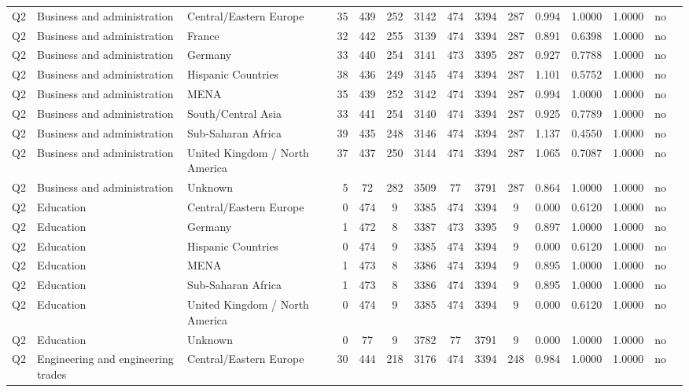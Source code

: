 \begin{longtable}{lllrcccccccccll}
Q2 & Business and administration & Central/Eastern Europe & 35 & 439 & 252 & 3142 & 474 & 3394 & 287 & 0.994 & 1.0000 & 1.0000 & no \\
Q2 & Business and administration & France & 32 & 442 & 255 & 3139 & 474 & 3394 & 287 & 0.891 & 0.6398 & 1.0000 & no \\
Q2 & Business and administration & Germany & 33 & 440 & 254 & 3141 & 473 & 3395 & 287 & 0.927 & 0.7788 & 1.0000 & no \\
Q2 & Business and administration & Hispanic Countries & 38 & 436 & 249 & 3145 & 474 & 3394 & 287 & 1.101 & 0.5752 & 1.0000 & no \\
Q2 & Business and administration & MENA & 35 & 439 & 252 & 3142 & 474 & 3394 & 287 & 0.994 & 1.0000 & 1.0000 & no \\
Q2 & Business and administration & South/Central Asia & 33 & 441 & 254 & 3140 & 474 & 3394 & 287 & 0.925 & 0.7789 & 1.0000 & no \\
Q2 & Business and administration & Sub-Saharan Africa & 39 & 435 & 248 & 3146 & 474 & 3394 & 287 & 1.137 & 0.4550 & 1.0000 & no \\
Q2 & Business and administration & United Kingdom / North America & 37 & 437 & 250 & 3144 & 474 & 3394 & 287 & 1.065 & 0.7087 & 1.0000 & no \\
Q2 & Business and administration & Unknown & 5 & 72 & 282 & 3509 & 77 & 3791 & 287 & 0.864 & 1.0000 & 1.0000 & no \\
Q2 & Education & Central/Eastern Europe & 0 & 474 & 9 & 3385 & 474 & 3394 & 9 & 0.000 & 0.6120 & 1.0000 & no \\
Q2 & Education & Germany & 1 & 472 & 8 & 3387 & 473 & 3395 & 9 & 0.897 & 1.0000 & 1.0000 & no \\
Q2 & Education & Hispanic Countries & 0 & 474 & 9 & 3385 & 474 & 3394 & 9 & 0.000 & 0.6120 & 1.0000 & no \\
Q2 & Education & MENA & 1 & 473 & 8 & 3386 & 474 & 3394 & 9 & 0.895 & 1.0000 & 1.0000 & no \\
Q2 & Education & Sub-Saharan Africa & 1 & 473 & 8 & 3386 & 474 & 3394 & 9 & 0.895 & 1.0000 & 1.0000 & no \\
Q2 & Education & United Kingdom / North America & 0 & 474 & 9 & 3385 & 474 & 3394 & 9 & 0.000 & 0.6120 & 1.0000 & no \\
Q2 & Education & Unknown & 0 & 77 & 9 & 3782 & 77 & 3791 & 9 & 0.000 & 1.0000 & 1.0000 & no \\
Q2 & Engineering and engineering trades & Central/Eastern Europe & 30 & 444 & 218 & 3176 & 474 & 3394 & 248 & 0.984 & 1.0000 & 1.0000 & no \\

\end{longtable}
